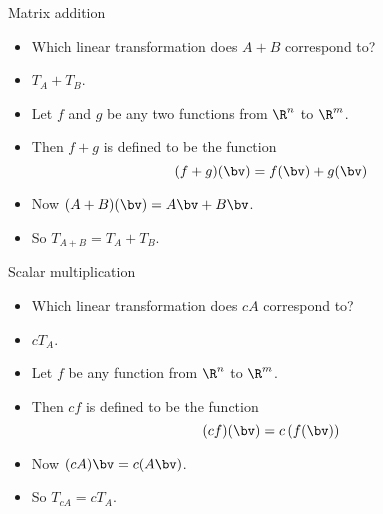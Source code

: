 \documentclass{beamer}
\begin{document}

\begin{frame}{Matrix addition}

\begin{itemize}
\item Which linear transformation does $A+B$ correspond to?
\item $T_A + T_B$.
\item Let $f$ and $g$ be any two functions from $\R^n$ to $\R^m$.
\item Then $f+g$ is defined to be the function
$$(f+g)(\bv) = f(\bv) + g(\bv)$$
\item Now $(A + B)(\bv) = A\bv + B\bv$.
\item So $T_{A+B} = T_A + T_B$.
\end{itemize}
\end{frame}


\begin{frame}{Scalar multiplication}

\begin{itemize}
\item Which linear transformation does $c A$ correspond to?
\item $c T_A$.
\item Let $f$ be any function from $\R^n$ to $\R^m$.
\item Then $c f$ is defined to be the function
$$(c f)(\bv) = c \left( f(\bv) \right)$$
\item Now $(c A)\bv = c(A\bv)$.
\item So $T_{cA} = cT_A$.
\end{itemize}
\end{frame}
\end{document}
